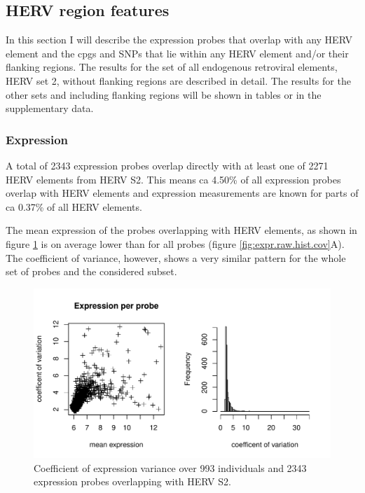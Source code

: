 \documentclass[a4paper,12pt]{article}
\begin{document}
\subsection{HERV region features}
In this section I will describe the expression probes that overlap with any HERV element and the cpgs and SNPs that lie within any HERV element and/or their flanking regions. The results for the set of all endogenous retroviral elements, HERV set 2, without flanking regions are described in detail. The results for the other sets and including flanking regions will be shown in tables or in the supplementary data.

\subsubsection{Expression}
A total of 2343 expression probes overlap directly with at least one of 2271 HERV elements from HERV S2. This means ca 4.50\% of all expression probes overlap with HERV elements and expression measurements are known for parts of ca 0.37\% of all HERV elements.

The mean expression of the probes overlapping with HERV elements, as shown in figure \ref{fig:hervS2.expr.var} is on average lower than for all probes (figure \ref{fig:expr.raw.hist.cov}A). The coefficient of variance, however, shows a very similar pattern for the whole set of probes and the considered subset.

\begin{figure}[tb]
	\includegraphics[scale = 1, keepaspectratio = true]{../figures/hervS2_expr_var}  
	\caption{Coefficient of expression variance over 993 individuals and 2343 expression probes overlapping with HERV S2.}
    \label{fig:hervS2.expr.var}
\end{figure}
\end{document}
